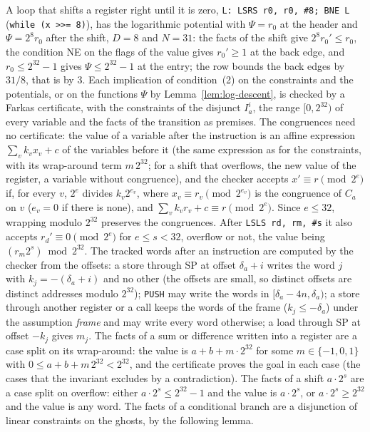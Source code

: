 \documentclass[oneside,english]{amsart}
\numberwithin{equation}{section}
\theoremstyle{plain}
\theoremstyle{definition}
\theoremstyle{plain}
\theoremstyle{plain}
\theoremstyle{remark}
\begin{document}
A loop that shifts a register right until it is zero, \texttt{L: LSRS r0, r0, \#8; BNE L} (\texttt{while (x >>= 8)}), has the logarithmic potential with $\Psi = r_0$ at the header and $\Psi = 2^{8} r_0$ after the shift, $D = 8$ and $N = 31$: the facts of the shift give $2^{8} r_0' \le r_0$, the condition NE on the flags of the value gives $r_0' \ge 1$ at the back edge, and $r_0 \le 2^{32} - 1$ gives $\Psi \le 2^{32} - 1$ at the entry; the row bounds the back edges by $31/8$, that is by $3$. Each implication of condition~(2) on the constraints and the potentials, or on the functions $\Psi$ by Lemma~\ref{lem:log-descent}, is checked by a Farkas certificate, with the constraints of the disjunct $I_a^i$, the range $[0, 2^{32})$ of every variable and the facts of the transition as premises. The congruences need no certificate: the value of a variable after the instruction is an affine expression $\sum_v k_v x_v + c$ of the variables before it (the same expression as for the constraints, with its wrap-around term $m\, 2^{32}$; for a shift that overflows, the new value of the register, a variable without congruence), and the checker accepts $x' \equiv r \pmod{2^e}$ if, for every $v$, $2^e$ divides $k_v 2^{e_v}$, where $x_v \equiv r_v \pmod{2^{e_v}}$ is the congruence of $C_a$ on $v$ ($e_v = 0$ if there is none), and $\sum_v k_v r_v + c \equiv r \pmod{2^e}$. Since $e \le 32$, wrapping modulo $2^{32}$ preserves the congruences. After \texttt{LSLS rd, rm, \#s} it also accepts $r_d' \equiv 0 \pmod{2^e}$ for $e \le s < 32$, overflow or not, the value being $(r_m 2^s) \bmod 2^{32}$. The tracked words after an instruction are computed by the checker from the offsets: a store through SP at offset $\delta_a + i$ writes the word $j$ with $k_j = -(\delta_a + i)$ and no other (the offsets are small, so distinct offsets are distinct addresses modulo $2^{32}$); \texttt{PUSH} may write the words in $[\delta_a - 4n, \delta_a)$; a store through another register or a call keeps the words of the frame ($k_j \le -\delta_a$) under the assumption \emph{frame} and may write every word otherwise; a load through SP at offset $-k_j$ gives $m_j$. The facts of a sum or difference written into a register are a case split on its wrap-around: the value is $a + b + m \cdot 2^{32}$ for some $m \in \{-1, 0, 1\}$ with $0 \le a + b + m\, 2^{32} < 2^{32}$, and the certificate proves the goal in each case (the cases that the invariant excludes by a contradiction). The facts of a shift $a \cdot 2^{s}$ are a case split on overflow: either $a \cdot 2^{s} \le 2^{32} - 1$ and the value is $a \cdot 2^{s}$, or $a \cdot 2^{s} \ge 2^{32}$ and the value is any word. The facts of a conditional branch are a disjunction of linear constraints on the ghosts, by the following lemma.
\end{document}
